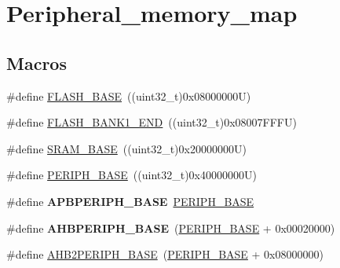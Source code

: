 \hypertarget{group___peripheral__memory__map}{}\section{Peripheral\+\_\+memory\+\_\+map}
\label{group___peripheral__memory__map}
\subsection*{Macros}
\begin{DoxyCompactItemize}
\item 
\#define \hyperlink{group___peripheral__memory__map_ga23a9099a5f8fc9c6e253c0eecb2be8db}{F\+L\+A\+S\+H\+\_\+\+B\+A\+SE}~((uint32\+\_\+t)0x08000000\+U)
\item 
\#define \hyperlink{group___peripheral__memory__map_ga443a2786535d83e32dfdc2b29e379332}{F\+L\+A\+S\+H\+\_\+\+B\+A\+N\+K1\+\_\+\+E\+ND}~((uint32\+\_\+t)0x08007\+F\+F\+F\+U)
\item 
\#define \hyperlink{group___peripheral__memory__map_ga05e8f3d2e5868754a7cd88614955aecc}{S\+R\+A\+M\+\_\+\+B\+A\+SE}~((uint32\+\_\+t)0x20000000\+U)
\item 
\#define \hyperlink{group___peripheral__memory__map_ga9171f49478fa86d932f89e78e73b88b0}{P\+E\+R\+I\+P\+H\+\_\+\+B\+A\+SE}~((uint32\+\_\+t)0x40000000\+U)
\item 
\mbox{\label{group___peripheral__memory__map_gac85f31889eb6a3f651b563bbc7131f91}} 
\#define {\bfseries A\+P\+B\+P\+E\+R\+I\+P\+H\+\_\+\+B\+A\+SE}~\hyperlink{group___peripheral__memory__map_ga9171f49478fa86d932f89e78e73b88b0}{P\+E\+R\+I\+P\+H\+\_\+\+B\+A\+SE}
\item 
\mbox{\label{group___peripheral__memory__map_ga92eb5d49730765d2abd0f5b09548f9f5}} 
\#define {\bfseries A\+H\+B\+P\+E\+R\+I\+P\+H\+\_\+\+B\+A\+SE}~(\hyperlink{group___peripheral__memory__map_ga9171f49478fa86d932f89e78e73b88b0}{P\+E\+R\+I\+P\+H\+\_\+\+B\+A\+SE} + 0x00020000)
\item 
\#define \hyperlink{group___peripheral__memory__map_gaeedaa71d22a1948492365e2cd26cfd46}{A\+H\+B2\+P\+E\+R\+I\+P\+H\+\_\+\+B\+A\+SE}~(\hyperlink{group___peripheral__memory__map_ga9171f49478fa86d932f89e78e73b88b0}{P\+E\+R\+I\+P\+H\+\_\+\+B\+A\+SE} + 0x08000000)
\item 
\mbox{\label{group___peripheral__memory__map_gaf0c34a518f87e1e505cd2332e989564a}} 

\end{DoxyCompactItemize}
